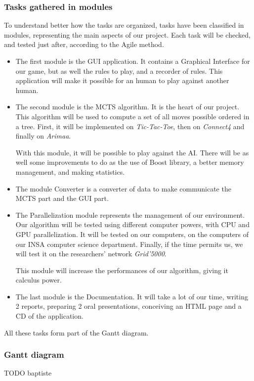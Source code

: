 \subsubsection{Tasks gathered in modules}

To understand better how the tasks are organized, tasks have been classified in modules, representing the main aspects of our project. Each task will be checked, and tested just after, according to the Agile method.

\begin{itemize}
  \item The first module is the GUI application. It contains a Graphical Interface for our game, but as well the rules to play, and a recorder of rules. 
This application will make it possible for an human to play against another human.
  \item The second module is the MCTS algorithm. It is the heart of our project. This algorithm will be used to compute a set of all moves possible ordered in a tree. First, it will be implemented on \textit{Tic-Tac-Toe}, then on \textit{Connect4} and finally on \textit{Arimaa}. 

With this module, it will be possible to play against the AI.
There will be as well some improvements to do as the use of Boost library, a better memory management, and making statistics.
  \item The module Converter is a converter of data to make communicate the MCTS part and the GUI part.
  \item The Parallelization module represents the management of our environment. Our algorithm will be tested using different computer powers, with CPU and GPU parallelization. It will be tested on our computers, on the computers of our INSA computer science department. Finally, if the time permits us, we will test it on the researchers' network \textit{Grid'5000}. 

This module will increase the performances of our algorithm, giving it calculus power.
  \item The last module is the Documentation. It will take a lot of our time, writing 2 reports, preparing 2 oral presentations, conceiving an HTML page and a CD of the application.
\end{itemize}
All these tasks form part of the Gantt diagram.

\subsubsection{Gantt diagram}
TODO baptiste